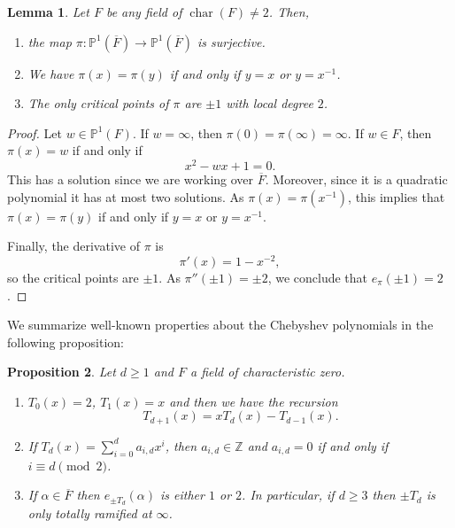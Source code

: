 \documentclass{amsart}
\def\ZZ{\mathbb Z}
\def\PP{\mathbb P}
\DeclareMathOperator{\car}{char}
\newtheorem{proposition}{Proposition}[section]
\newtheorem{lemma}[proposition]{Lemma}
\theoremstyle{definition}
\begin{document}
\begin{lemma}
Let $F$ be any field of $\car(F) \neq 2$. Then,
\begin{enumerate}
\item the map $\pi: \PP^1(\overline{F}) \rightarrow \PP^1(\overline{F})$ is surjective. 
\item We have $\pi(x) = \pi(y)$ if and only if $y = x$ or $y = x^{-1}$. 
\item The only critical points of $\pi$ are $\pm 1$ with local degree $2$.
\end{enumerate}
\label{lemma: properties pi}
\end{lemma}

\begin{proof}
Let $w \in \PP^1(F)$. If $w = \infty$, then $\pi(0) = \pi(\infty) = \infty$. If $w \in F$, then $\pi(x) = w$ if and only if $$x^2 -wx + 1 = 0.$$ This has a solution since we are working over $\overline{F}$. Moreover, since it is a quadratic polynomial it has at most two solutions. As $\pi(x) = \pi(x^{-1})$, this implies that $\pi(x) = \pi(y)$ if and only if $y = x$ or $y = x^{-1}$.

Finally, the derivative of $\pi$ is $$\pi'(x) = 1 - x^{-2},$$ so the critical points are $\pm 1$. As $\pi''(\pm 1) = \pm 2$, we conclude that $e_\pi(\pm 1) = 2$.
\end{proof}

We summarize well-known properties about the Chebyshev polynomials in the following proposition:

\begin{proposition}
Let $d \geq 1$ and $F$ a field of characteristic zero. 
\begin{enumerate}
\item $T_0(x) = 2$, $T_1(x) = x$ and then we have the recursion $$T_{d+1}(x) = x T_d(x) - T_{d-1}(x).$$
\item If $T_d(x) = \sum_{i = 0}^d a_{i,d} x^i$, then $a_{i,d} \in \ZZ$ and $a_{i,d} = 0$ if and only if $i \equiv d \pmod{2}$.
\item If $\alpha \in \overline{F}$ then $e_{\pm T_d}(\alpha)$ is either $1$ or $2$. In particular, if $d \geq 3$ then $\pm T_d$ is only totally ramified at $\infty$.
\end{enumerate}
\label{proposition: properties Chebyshev polynomials}
\end{proposition}
\end{document}
